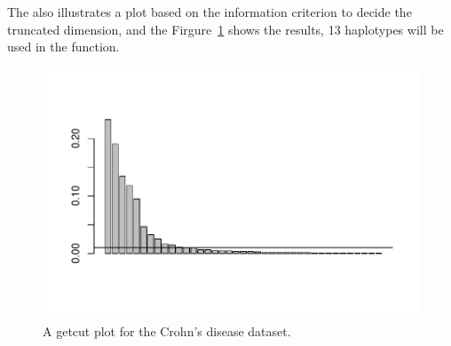 The  also illustrates a plot based on the information
criterion to decide the truncated dimension, and
the Firgure~\ref{fig:getcut} shows the results,
13 haplotypes will be used in the  function.
\begin{figure}[h]
\begin{center}
\includegraphics[width=6.0in]{./phyclust-graph/getcut}
\caption{A getcut plot for the Crohn's disease dataset.}
\label{fig:getcut}
\end{center}
\end{figure}
